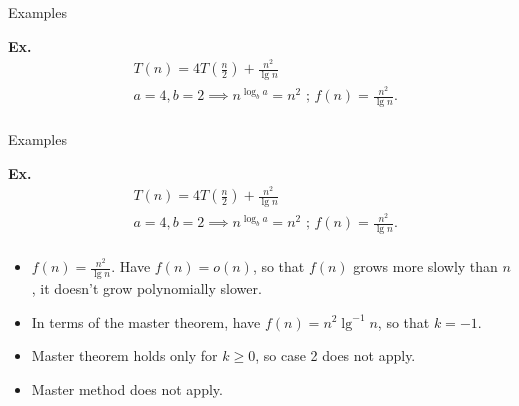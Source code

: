 \documentclass{beamer}
\begin{document}
\begin{frame}{Examples}
    \begin{exampleblock}{\textbf{Ex.}}
        \vspace{-8mm}
        \begin{align*}
            & T(n) = 4T\left(\frac{n}{2} \right) + \frac{n^2}{\lg n} \\
            & a = 4, b = 2 \implies n^{\log_b a} = n^2 \text{ ; } f(n) = \frac{n^2}{\lg n} \text{.} \\
        \end{align*}
    \end{exampleblock}
\end{frame}

\begin{frame}{Examples}
    \begin{exampleblock}{\textbf{Ex.}}
        \vspace{-8mm}
        \begin{align*}
            & T(n) = 4T\left(\frac{n}{2} \right) + \frac{n^2}{\lg n} \\
            & a = 4, b = 2 \implies n^{\log_b a} = n^2 \text{ ; } f(n) = \frac{n^2}{\lg n} \text{.} \\
        \end{align*}
        \vspace{-10mm}
        \small
        \begin{itemize}
            \item $f(n) = \frac{n^2}{\lg n}$. Have $f(n) = o(n)$, so that $f(n)$ grows more slowly than $n$, it doesn’t grow polynomially slower.
            \item In terms of the master theorem, have $f(n) = n^2\lg^{-1} n$, so that $k = -1$.
            \item Master theorem holds only for $k \geq 0$, so case 2 does not apply.
            \item Master method does not apply.
        \end{itemize}
    \end{exampleblock}
\end{frame}
\end{document}
